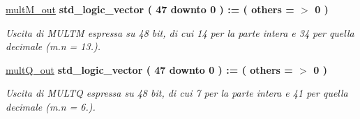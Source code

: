\begin{DoxyCompactItemize}
\hyperlink{group___linear_regression_gae1fb15e247aa1abc0a406f879fbe6627}{mult\+M\+\_\+out} {\bfseries \textcolor{vhdlchar}{std\+\_\+logic\+\_\+vector}\textcolor{vhdlchar}{ }\textcolor{vhdlchar}{(}\textcolor{vhdlchar}{ }\textcolor{vhdlchar}{ } \textcolor{vhdldigit}{47} \textcolor{vhdlchar}{ }\textcolor{vhdlchar}{downto}\textcolor{vhdlchar}{ }\textcolor{vhdlchar}{ } \textcolor{vhdldigit}{0} \textcolor{vhdlchar}{ }\textcolor{vhdlchar}{)}\textcolor{vhdlchar}{ }\textcolor{vhdlchar}{ }\textcolor{vhdlchar}{ }\textcolor{vhdlchar}{\+:}\textcolor{vhdlchar}{=}\textcolor{vhdlchar}{ }\textcolor{vhdlchar}{(}\textcolor{vhdlchar}{ }\textcolor{vhdlchar}{ }\textcolor{vhdlchar}{others}\textcolor{vhdlchar}{ }\textcolor{vhdlchar}{ }\textcolor{vhdlchar}{=}\textcolor{vhdlchar}{ }\textcolor{vhdlchar}{$>$}\textcolor{vhdlchar}{ }\textcolor{vhdlchar}{\textquotesingle{}}\textcolor{vhdlchar}{ } \textcolor{vhdldigit}{0} \textcolor{vhdlchar}{ }\textcolor{vhdlchar}{\textquotesingle{}}\textcolor{vhdlchar}{ }\textcolor{vhdlchar}{)}\textcolor{vhdlchar}{ }} 
\begin{DoxyCompactList}\small\item\em Uscita di M\+U\+L\+TM espressa su 48 bit, di cui 14 per la parte intera e 34 per quella decimale (m.\+n = 13.). \end{DoxyCompactList}\item 
\hyperlink{group___linear_regression_gab45555807d57a057b5cd46161e28b6a5}{mult\+Q\+\_\+out} {\bfseries \textcolor{vhdlchar}{std\+\_\+logic\+\_\+vector}\textcolor{vhdlchar}{ }\textcolor{vhdlchar}{(}\textcolor{vhdlchar}{ }\textcolor{vhdlchar}{ } \textcolor{vhdldigit}{47} \textcolor{vhdlchar}{ }\textcolor{vhdlchar}{downto}\textcolor{vhdlchar}{ }\textcolor{vhdlchar}{ } \textcolor{vhdldigit}{0} \textcolor{vhdlchar}{ }\textcolor{vhdlchar}{)}\textcolor{vhdlchar}{ }\textcolor{vhdlchar}{ }\textcolor{vhdlchar}{ }\textcolor{vhdlchar}{\+:}\textcolor{vhdlchar}{=}\textcolor{vhdlchar}{ }\textcolor{vhdlchar}{(}\textcolor{vhdlchar}{ }\textcolor{vhdlchar}{ }\textcolor{vhdlchar}{others}\textcolor{vhdlchar}{ }\textcolor{vhdlchar}{ }\textcolor{vhdlchar}{=}\textcolor{vhdlchar}{ }\textcolor{vhdlchar}{$>$}\textcolor{vhdlchar}{ }\textcolor{vhdlchar}{\textquotesingle{}}\textcolor{vhdlchar}{ } \textcolor{vhdldigit}{0} \textcolor{vhdlchar}{ }\textcolor{vhdlchar}{\textquotesingle{}}\textcolor{vhdlchar}{ }\textcolor{vhdlchar}{)}\textcolor{vhdlchar}{ }} 
\begin{DoxyCompactList}\small\item\em Uscita di M\+U\+L\+TQ espressa su 48 bit, di cui 7 per la parte intera e 41 per quella decimale (m.\+n = 6.). \end{DoxyCompactList}\end{DoxyCompactItemize}


